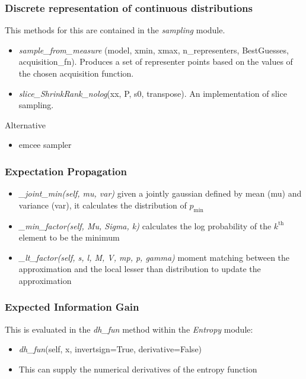 \documentclass[10pt,handout]{beamer}
\begin{document}
\begin{frame}
\frametitle{Discrete representation of continuous distributions}

This methods for this are contained in the \emph{sampling} module.

\begin{itemize}
  \item \emph{sample\_from\_measure}
  (model, xmin, xmax, n\_representers, BestGuesses, acquisition\_fn). Produces 
  a set of representer points based on the values of the chosen acquisition 
  function.
  
  \item \emph{slice\_ShrinkRank\_nolog}(xx, P, s0, transpose). An implementation
  of slice sampling.
\end{itemize}

Alternative 

\begin{itemize}
\item emcee sampler
\end{itemize}

\end{frame}

\begin{frame}
\frametitle{Expectation Propagation}

\begin{itemize}
  \item\emph{\_joint\_min(self, mu, var)}
  given a jointly gaussian defined by mean (mu) and  variance (var), it calculates the distribution of $p_\text{min}$ 
  \item\emph{\_min\_factor(self, Mu, Sigma, k)}
  calculates the log probability of the $k^\text{th}$ element to be the minimum
  \item\emph{\_lt\_factor(self, s, l, M, V, mp, p, gamma)}
  moment matching between the approximation and the local lesser than distribution to update the approximation
\end{itemize}


\end{frame}

\begin{frame}
\frametitle{Expected Information Gain}

This is evaluated in the \emph{dh\_fun} method within the \emph{Entropy} module:

\begin{itemize}
  \item \emph{dh\_fun}(self, x, invertsign=True, derivative=False)
  \item This can supply the numerical derivatives of the entropy function

\end{itemize}


\end{frame}
\end{document}
